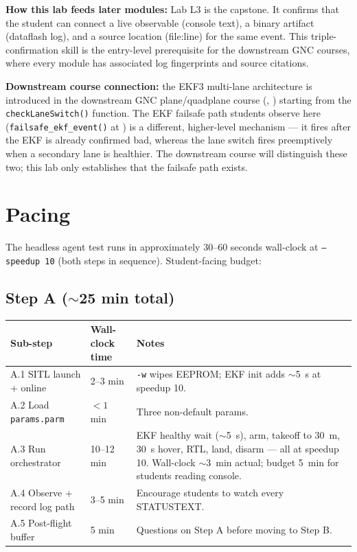 \documentclass[a4paper,11pt,twoside]{article}
\begin{document}
\textbf{How this lab feeds later modules:} Lab L3 is the capstone. It confirms that the student can connect a live observable (console text), a binary artifact (dataflash log), and a source location (file:line) for the same event. This triple-confirmation skill is the entry-level prerequisite for the downstream GNC courses, where every module has associated log fingerprints and source citations.

\textbf{Downstream course connection:} the EKF3 multi-lane architecture is introduced in the downstream GNC plane/quadplane course (\siblingplane, \siblingquadplane) starting from the \texttt{checkLaneSwitch()} function. The EKF failsafe path students observe here (\texttt{failsafe\_ekf\_event()} at ) is a different, higher-level mechanism --- it fires after the EKF is already confirmed bad, whereas the lane switch fires preemptively when a secondary lane is healthier. The downstream course will distinguish these two; this lab only establishes that the failsafe path exists.

\section*{Pacing}

The headless agent test runs in approximately 30--60 seconds wall-clock at \texttt{--speedup 10} (both steps in sequence). Student-facing budget:

\subsection*{Step A ($\sim$25 min total)}

\begin{center}\small
\begin{tabular}{|p{4.5cm}|p{3.0cm}|p{7.0cm}|}\hline
\textbf{Sub-step} & \textbf{Wall-clock time} & \textbf{Notes} \\ \hline
A.1 SITL launch + online & 2--3 min & \texttt{-w} wipes EEPROM; EKF init adds $\sim$5~s at speedup 10. \\ \hline
A.2 Load \texttt{params.parm} & $<1$ min & Three non-default params. \\ \hline
A.3 Run orchestrator & 10--12 min & EKF healthy wait ($\sim$5~s), arm, takeoff to 30~m, 30~s hover, RTL, land, disarm --- all at speedup 10. Wall-clock $\sim$3~min actual; budget 5~min for students reading console. \\ \hline
A.4 Observe + record log path & 3--5 min & Encourage students to watch every STATUSTEXT. \\ \hline
A.5 Post-flight buffer & 5 min & Questions on Step A before moving to Step B. \\ \hline
\end{tabular}
\end{center}
\end{document}
